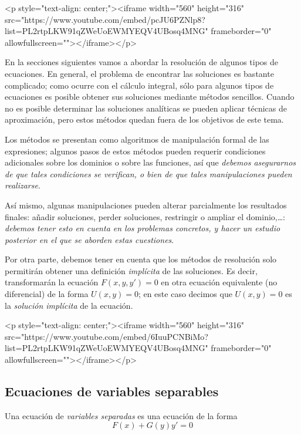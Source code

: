 \begin{rawhtml}
<p style="text-align: center;"><iframe width="560" height="316" src="https://www.youtube.com/embed/pcJU6PZNlp8?list=PL2rtpLKW91qZWeUoEWMYEQV4UBosq4MNG" frameborder="0" allowfullscreen=""></iframe></p>
\end{rawhtml}

En la secciones siguientes vamos a abordar la resolución de algunos tipos de ecuaciones.
En general, el problema de encontrar las soluciones es bastante complicado; como ocurre con el cálculo integral, sólo para algunos tipos de ecuaciones es posible obtener sus soluciones mediante métodos sencillos.
Cuando no es posible determinar las soluciones analíticas se pueden aplicar técnicas de aproximación, pero estos métodos quedan fuera de los objetivos de este tema.

Los métodos se presentan como algoritmos de manipulación formal de las expresiones; algunos pasos de estos métodos pueden requerir condiciones adicionales sobre los dominios o sobre las funciones, así que \emph{debemos asegurarnos de que tales condiciones se verifican, o bien de que tales manipulaciones pueden realizarse}.

Así mismo, algunas manipulaciones pueden alterar parcialmente los resultados finales: añadir soluciones, perder soluciones, restringir o ampliar el dominio,\dots : \emph{debemos tener esto en cuenta en los problemas concretos, y hacer un estudio posterior en el que se aborden estas cuestiones}.

Por otra parte, debemos tener en cuenta que los métodos de resolución solo permitirán obtener una definición \emph{implícita} de las soluciones.
Es decir, transformarán la ecuación $F(x,y,y')=0$ en otra ecuación equivalente (no diferencial) de la forma $U(x,y)=0$; en este caso decimos que $U(x,y)=0$ es la \emph{solución implícita} de la ecuación.

\begin{rawhtml}
<p style="text-align: center;"><iframe width="560" height="316" src="https://www.youtube.com/embed/6IuuPCNBiMo?list=PL2rtpLKW91qZWeUoEWMYEQV4UBosq4MNG" frameborder="0" allowfullscreen=""></iframe></p>
\end{rawhtml}

\subsection{Ecuaciones de variables separables}

Una ecuación de \emph{variables separadas} es una ecuación de la forma
$$
F(x)+G(y)y'=0
$$

